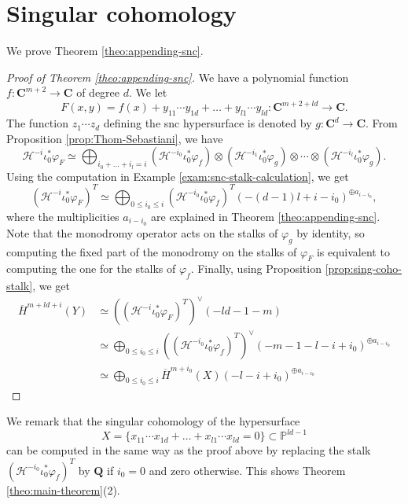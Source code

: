 \documentclass[letterpaper,11pt]{amsart}
\theoremstyle{plain}
\theoremstyle{definition}
\theoremstyle{remark}
\newcommand{\PP}{\mathbb{P}}
\newcommand{\QQ}{\mathbf{Q}}
\newcommand{\CC}{\mathbf{C}}
\newcommand{\cH}{\mathcal{H}}
\newcommand{\sta}{^{*}}
\newcommand{\dual}{^{\vee}}
\begin{document}
    \section{Singular cohomology}
    We prove Theorem \ref{theo:appending-snc}.
    \begin{proof}[Proof of Theorem \ref{theo:appending-snc}]
         We have a polynomial function $f \colon \CC^{m+2} \to \CC$ of degree $d$. We let
    $$ F(x, y) = f(x) + y_{11}\cdots y_{1d} + \ldots + y_{l1} \cdots y_{ld} \colon \CC^{m+2+ ld} \to \CC.$$
    The function $z_{1}\cdots z_{d}$ defining the snc hypersurface is denoted by $g \colon \CC^{d} \to \CC$. From Proposition \ref{prop:Thom-Sebastiani}, we have
    $$ \cH^{-i} \iota_{0}\sta \varphi_{F} \simeq \bigoplus_{i_{0}+ \ldots + i_{l} = i} \left(\cH^{-i_{0}}\iota_{0}\sta \varphi_{f}\right) \otimes\left(\cH^{-i_{1}}\iota_{0}\sta \varphi_{g}\right)\otimes \cdots \otimes \left(\cH^{-i_{l}}\iota_{0}\sta \varphi_{g}\right).$$
    Using the computation in Example \ref{exam:snc-stalk-calculation}, we get
    $$ \left( \cH^{-i} \iota_{0}\sta \varphi_{F} \right)^{T} \simeq \bigoplus_{0 \leq i_{0} \leq i} \left( \cH^{-i_{0}}\iota_{0}\sta \varphi_{f} \right)^{T} (-(d-1)l + i-i_{0})^{\oplus a_{i-i_{0}}},$$
    where the multiplicities $a_{i-i_{0}}$ are explained in Theorem \ref{theo:appending-snc}. Note that the monodromy operator acts on the stalks of $\varphi_{g}$ by identity, so computing the fixed part of the monodromy on the stalks of $\varphi_{F}$ is equivalent to computing the one for the stalks of $\varphi_{f}$. Finally, using Proposition \ref{prop:sing-coho-stalk}, we get
    \begin{align*}
        \overline{H}^{m+ld+i}(Y) &\simeq \left( (\cH^{-i}\iota_{0}\sta \varphi_{F})^{T}\right)\dual (-ld-1-m)\\
        & \simeq \bigoplus_{0 \leq i_{0} \leq i} \left( (\cH^{-i_{0}}\iota_{0}\sta \varphi_{f})^{T}\right)\dual (-m-1-l-i+i_{0})^{\oplus a_{i-i_{0}}} \\
        & \simeq \bigoplus_{0 \leq i_{0} \leq i} \overline{H}^{m+ i_{0}}(X)(-l-i+i_{0})^{\oplus a_{i-i_{0}}}
    \end{align*}
    \end{proof}

    We remark that the singular cohomology of the hypersurface
    $$ X = \{ x_{11} \cdots x_{1d} + \ldots + x_{l1} \cdots x_{ld} = 0\} \subset \PP^{ld-1}$$
    can be computed in the same way as the proof above by replacing the stalk $(\cH^{-i_{0}} \iota_{0}\sta \varphi_{f})^{T}$ by $\QQ$ if $i_{0} = 0$ and zero otherwise. This shows Theorem \ref{theo:main-theorem}(2).
\end{document}
